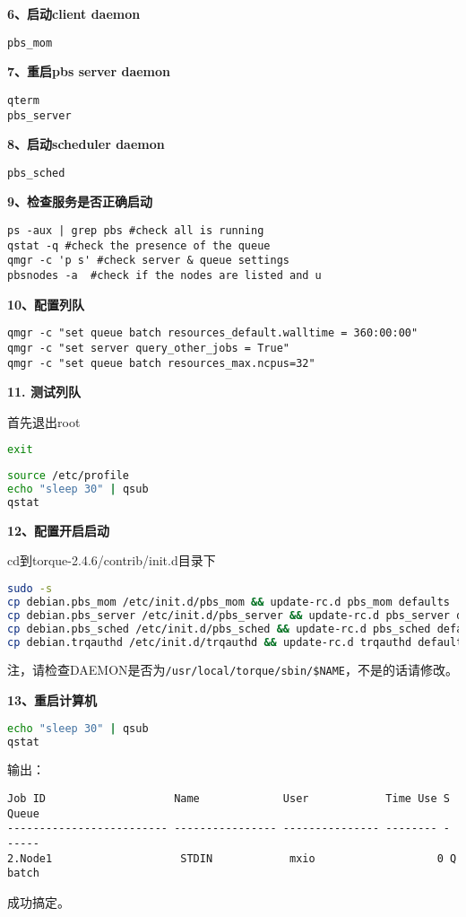 {\textbf{6、启动client daemon}

\verb|pbs_mom|

\textbf{7、重启pbs server daemon}
\begin{verbatim}
qterm
pbs_server
\end{verbatim}

\textbf{8、启动scheduler daemon}

\verb|pbs_sched|

\textbf{9、检查服务是否正确启动}
\begin{verbatim}
ps -aux | grep pbs #check all is running
qstat -q #check the presence of the queue
qmgr -c 'p s' #check server & queue settings
pbsnodes -a  #check if the nodes are listed and u
\end{verbatim}

\textbf{10、配置列队}
\begin{verbatim}
qmgr -c "set queue batch resources_default.walltime = 360:00:00"
qmgr -c "set server query_other_jobs = True"
qmgr -c "set queue batch resources_max.ncpus=32"
\end{verbatim}

\textbf{11. 测试列队}

首先退出root
\begin{lstlisting}[language=sh]
exit
\end{lstlisting}
\begin{lstlisting}[language=sh]
source /etc/profile
echo "sleep 30" | qsub
qstat
\end{lstlisting}

\textbf{12、配置开启启动}

cd到torque-2.4.6/contrib/init.d目录下
\begin{lstlisting}[language=sh]
sudo -s
cp debian.pbs_mom /etc/init.d/pbs_mom && update-rc.d pbs_mom defaults
cp debian.pbs_server /etc/init.d/pbs_server && update-rc.d pbs_server defaults
cp debian.pbs_sched /etc/init.d/pbs_sched && update-rc.d pbs_sched defaults
cp debian.trqauthd /etc/init.d/trqauthd && update-rc.d trqauthd defaults
\end{lstlisting}
注，请检查DAEMON是否为\verb|/usr/local/torque/sbin/$NAME|，不是的话请修改。

\textbf{13、重启计算机}
\begin{lstlisting}[language=sh]
echo "sleep 30" | qsub
qstat
\end{lstlisting}
输出：
\begin{verbatim}
Job ID                    Name             User            Time Use S Queue
------------------------- ---------------- --------------- -------- - -----
2.Node1                    STDIN            mxio                   0 Q batch
\end{verbatim}
成功搞定。



}
